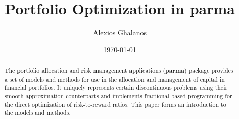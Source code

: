 \documentclass[11pt,a4paper]{article}
\begin{document}
\title{Portfolio Optimization in \textbf{parma}}
\author{Alexios Ghalanos}
\date{\today}
\maketitle
\begin{abstract}
The \textbf{p}ortfolio \textbf{a}llocation and \textbf{r}isk \textbf{m}anagement 
\textbf{a}pplications (\textbf{parma}) package provides a set of models and 
methods for use in the allocation and management of capital in financial portfolios. 
It uniquely represents certain discontinuous problems using their smooth approximation 
counterparts and implements fractional based programming for the direct optimization 
of risk-to-reward ratios. This paper forms an introduction to the models and methods.
\end{abstract}
\clearpage
\newpage

\clearpage

\end{document}
